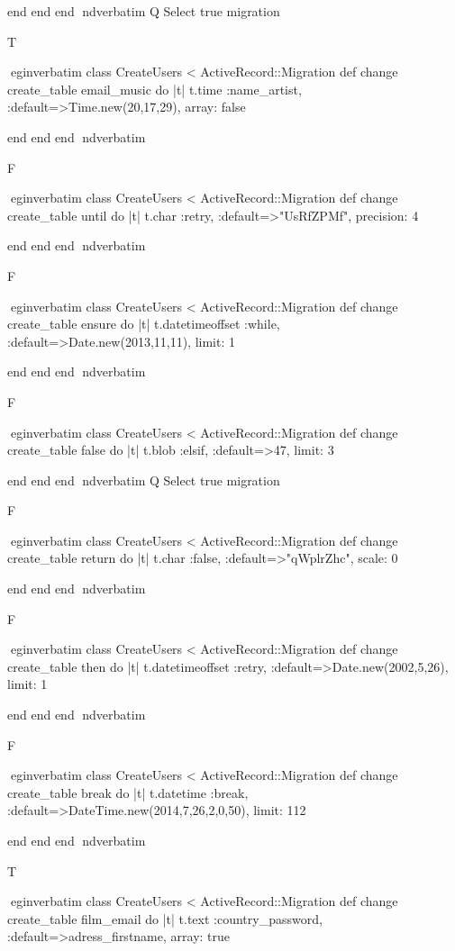     end 
  end 
end
nd{verbatim}
Q
 Select true migration

T

egin{verbatim}
 class CreateUsers < ActiveRecord::Migration 
  def change 
    create_table email_music do |t| 
      t.time :name_artist, :default=>Time.new(20,17,29), array: false
    
    end 
  end 
end
nd{verbatim}

F

egin{verbatim}
 class CreateUsers < ActiveRecord::Migration 
  def change 
    create_table until do |t| 
      t.char :retry, :default=>"UsRfZPMf", precision: 4
    
    end 
  end 
end
nd{verbatim}

F

egin{verbatim}
 class CreateUsers < ActiveRecord::Migration 
  def change 
    create_table ensure do |t| 
      t.datetimeoffset :while, :default=>Date.new(2013,11,11), limit: 1
    
    end 
  end 
end
nd{verbatim}

F

egin{verbatim}
 class CreateUsers < ActiveRecord::Migration 
  def change 
    create_table false do |t| 
      t.blob :elsif, :default=>47, limit: 3
    
    end 
  end 
end
nd{verbatim}
Q
 Select true migration

F

egin{verbatim}
 class CreateUsers < ActiveRecord::Migration 
  def change 
    create_table return do |t| 
      t.char :false, :default=>"qWplrZhc", scale: 0
    
    end 
  end 
end
nd{verbatim}

F

egin{verbatim}
 class CreateUsers < ActiveRecord::Migration 
  def change 
    create_table then do |t| 
      t.datetimeoffset :retry, :default=>Date.new(2002,5,26), limit: 1
    
    end 
  end 
end
nd{verbatim}

F

egin{verbatim}
 class CreateUsers < ActiveRecord::Migration 
  def change 
    create_table break do |t| 
      t.datetime :break, :default=>DateTime.new(2014,7,26,2,0,50), limit: 112
    
    end 
  end 
end
nd{verbatim}

T

egin{verbatim}
 class CreateUsers < ActiveRecord::Migration 
  def change 
    create_table film_email do |t| 
      t.text :country_password, :default=>adress_firstname, array: true
    
